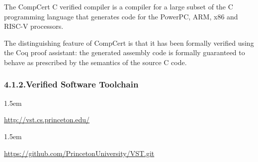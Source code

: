 \documentclass[12pt,twoside]{article}
\begin{document}
\noindent{}The CompCert C verified compiler is a compiler for a large subset of
the C programming language that generates code for the PowerPC, ARM,
x86 and RISC-V processors.%

The distinguishing feature of CompCert is that it has been formally
verified using the Coq proof assistant: the generated assembly code is
formally guaranteed to behave as prescribed by the semantics of the
source C code.%

\subsubsection{4.1.2.\hspace*{0.5em}Verified Software Toolchain}\label{sec-verified-software-toolchain}%

\begin{mddefinitions}%


\begin{mdbmarginx}{}{}{}{1.5em}%
\begin{mddefdata}%
\href{http://vst.cs.princeton.edu/}{{\ttfamily http://\hspace{0pt}vst.\hspace{0pt}cs.\hspace{0pt}princeton.\hspace{0pt}edu/\hspace{0pt}}}
\end{mddefdata}%
\end{mdbmarginx}%


\begin{mdbmarginx}{}{}{}{1.5em}%
\begin{mddefdata}%
\href{https://github.com/PrincetonUniversity/VST.git}{{\ttfamily https://\hspace{0pt}github.\hspace{0pt}com/\hspace{0pt}PrincetonUniversity/\hspace{0pt}VST.\hspace{0pt}git}}%
\end{mddefdata}%
\end{mdbmarginx}%
\end{mddefinitions}%
\end{document}
